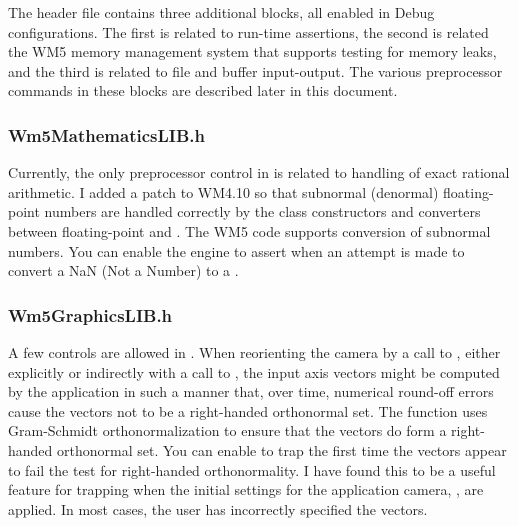 \documentclass{article}
\begin{document}
The header file contains three additional blocks, all enabled in Debug
configurations.  The first is related to run-time assertions, the second is
related the WM5 memory management system that supports testing for memory
leaks, and the third is related to file and buffer input-output.  The various
preprocessor commands in these blocks are described later in this document.

\subsubsection{Wm5MathematicsLIB.h}

Currently, the only preprocessor control in  is
related to handling of exact rational arithmetic.  I added a patch to
WM4.10 so that subnormal (denormal) floating-point numbers are handled
correctly by the class  constructors and converters between
floating-point and .  The WM5 code supports conversion of
subnormal numbers.  You can enable the engine to assert when an attempt is
made to convert a NaN (Not a Number) to a .

\subsubsection{Wm5GraphicsLIB.h}

A few controls are allowed in .  When reorienting the
camera by a call to , either explicitly or indirectly
with a call to , the input axis vectors might be
computed by the application in such a manner that, over time, numerical
round-off errors cause the vectors not to be a right-handed orthonormal set.
The  function uses Gram-Schmidt orthonormalization to ensure
that the vectors do form a right-handed orthonormal set.  You can enable
 to trap the first time the
vectors appear to fail the test for right-handed orthonormality.  I have
found this to be a useful feature for trapping when the initial settings
for the application camera, , are applied.  In most cases,
the user has incorrectly specified the vectors.
\end{document}
